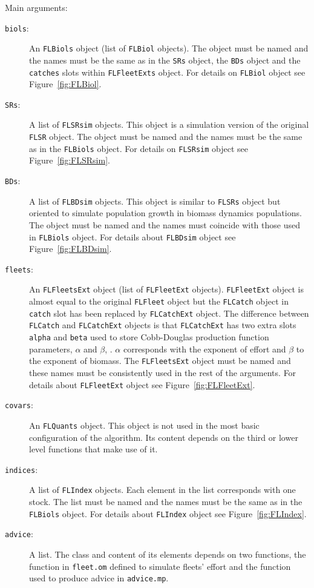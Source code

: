\noindent Main arguments:
\begin{description}
	\item[\texttt{biols}:] An \texttt{FLBiols} object (list of \texttt{FLBiol} objects). The object must be named and the names must be the same as in the \texttt{SRs} object, the \texttt{BDs} object and the \texttt{catches} slots within \texttt{FLFleetExts} object. For details on \texttt{FLBiol} object see Figure~\ref{fig:FLBiol}. 
	\item[\texttt{SRs}:] A list of \texttt{FLSRsim} objects. This object is a simulation version of the original \texttt{FLSR} object. The object must be named and the names must be the same as in the \texttt{FLBiols} object. For details on \texttt{FLSRsim} object see Figure~\ref{fig:FLSRsim}.
	\item[\texttt{BDs}:] A list of \texttt{FLBDsim} objects. This object is similar to \texttt{FLSRs} object but oriented to simulate	population growth in biomass dynamics populations. The object must be named and the names must coincide with those used in \texttt{FLBiols} object. For details about \texttt{FLBDsim} object see Figure~\ref{fig:FLBDsim}.
	\item[\texttt{fleets}:] An \texttt{FLFleetsExt} object (list of \texttt{FLFleetExt} objects). \texttt{FLFleetExt} object is almost equal to the original \texttt{FLFleet} object but the \texttt{FLCatch} object in \texttt{catch} slot has been replaced by \texttt{FLCatchExt} object. The difference between  \texttt{FLCatch}  and \texttt{FLCatchExt} objects is that \texttt{FLCatchExt} has two extra slots \texttt{alpha} and \texttt{beta} used to store Cobb-Douglas production function parameters, $\alpha$ and $\beta$, \citep{Cobb1928, Clark1990}. $\alpha$ corresponds with the exponent of effort and $\beta$ to the exponent of biomass. The \texttt{FLFleetsExt} object must be named and these names must be consistently used in the rest of the arguments. For details about \texttt{FLFleetExt} object see Figure~\ref{fig:FLFleetExt}.
	\item[\texttt{covars}:] An \texttt{FLQuants} object. This object is not used in the most basic configuration of the algorithm. Its content depends on the third or lower level functions that make use of it.  
	\item[\texttt{indices}:] A list of \texttt{FLIndex} objects. Each element in the list corresponds with one stock. The list must be named and the names must be the same as in the \texttt{FLBiols} object. For details about \texttt{FLIndex} object see Figure~\ref{fig:FLIndex}.
	\item[\texttt{advice}:] A list. The class and content of its elements depends on two functions, the function in \texttt{fleet.om} defined to simulate fleets' effort and the function used to produce advice in \texttt{advice.mp}. 
\end{description}
   
